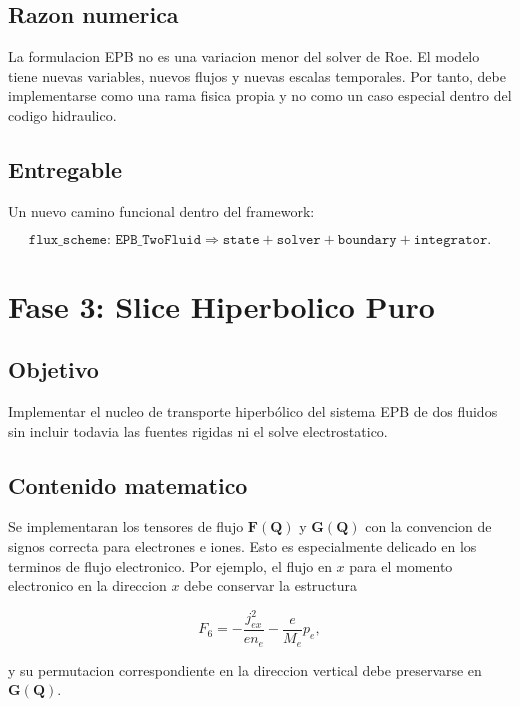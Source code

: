 \documentclass[11pt]{article}
\begin{document}
\subsection*{Razon numerica}

La formulacion EPB no es una variacion menor del solver de Roe. El modelo tiene nuevas variables, nuevos flujos y nuevas escalas temporales. Por tanto, debe implementarse como una rama fisica propia y no como un caso especial dentro del codigo hidraulico.

\subsection*{Entregable}

Un nuevo camino funcional dentro del framework:

\begin{equation}
\texttt{flux\_scheme: EPB\_TwoFluid}
\Longrightarrow
\texttt{state} + \texttt{solver} + \texttt{boundary} + \texttt{integrator}.
\end{equation}

\section{Fase 3: Slice Hiperbolico Puro}

\subsection*{Objetivo}

Implementar el nucleo de transporte hiperb\'olico del sistema EPB de dos fluidos sin incluir todavia las fuentes rigidas ni el solve electrostatico.

\subsection*{Contenido matematico}

Se implementaran los tensores de flujo $\mathbf{F}(\mathbf{Q})$ y $\mathbf{G}(\mathbf{Q})$ con la convencion de signos correcta para electrones e iones. Esto es especialmente delicado en los terminos de flujo electronico. Por ejemplo, el flujo en $x$ para el momento electronico en la direccion $x$ debe conservar la estructura

\begin{equation}
F_6 = -\frac{j_{ex}^{2}}{e n_e} - \frac{e}{M_e} p_e,
\end{equation}

y su permutacion correspondiente en la direccion vertical debe preservarse en $\mathbf{G}(\mathbf{Q})$.
\end{document}
